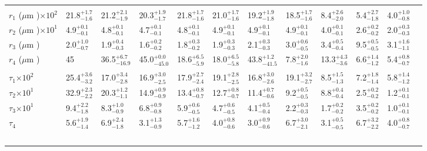 \documentclass[article,11pt]{emulateapj}
\def\mum{$\mu$m }
\begin{document}
\begin{table*}[!htb]
\begin{scriptsize}
\begin{tabular}{l l l l l l l l l l l l}
\hline\\[-0.1in]
$r_1$ (\mum)$\times 10^2$ &  21.8$^{+  1.7}_{-  1.6}$ &  21.2$^{+  2.1}_{-  1.9}$ &  20.3$^{+  1.9}_{-  1.7}$ &  21.8$^{+  1.7}_{-  1.6}$ &  21.0$^{+  1.7}_{-  1.6}$ &  19.2$^{+  1.9}_{-  1.8}$ &  18.5$^{+  1.7}_{-  1.6}$ &   8.4$^{+  2.6}_{-  2.0}$ &   5.4$^{+  2.7}_{-  1.8}$ &   4.0$^{+  1.0}_{-  0.8}$\\[0.05in]
$r_2$ (\mum)$\times 10^1$ &   4.9$^{+  0.1}_{-  0.1}$ &   4.8$^{+  0.1}_{-  0.1}$ &   4.7$^{+  0.1}_{-  0.1}$ &   4.8$^{+  0.1}_{-  0.1}$ &   4.9$^{+  0.1}_{-  0.1}$ &   4.9$^{+  0.1}_{-  0.1}$ &   4.9$^{+  0.1}_{-  0.1}$ &   4.0$^{+  0.1}_{-  0.1}$ &   2.6$^{+  0.2}_{-  0.2}$ &   2.0$^{+  0.3}_{-  0.3}$\\[0.05in]
             $r_3$ (\mum) &   2.0$^{+  1.0}_{-  0.7}$ &   1.9$^{+  0.4}_{-  0.3}$ &   1.6$^{+  0.2}_{-  0.2}$ &   1.8$^{+  0.3}_{-  0.2}$ &   1.9$^{+  0.3}_{-  0.3}$ &   2.1$^{+  0.3}_{-  0.3}$ &   3.0$^{+  0.6}_{-  0.5}$ &   3.4$^{+  0.5}_{-  0.4}$ &   9.5$^{+  0.5}_{-  0.5}$ &   3.1$^{+  1.6}_{-  1.1}$\\[0.05in]
             $r_4$ (\mum) &  45 &  36.5$^{+  6.7}_{- 16.9}$ &  45.0$^{+  0.0}_{- 45.0}$ &  18.6$^{+  6.5}_{-  5.9}$ &  18.0$^{+  6.5}_{-  5.8}$ &  43.8$^{+  1.2}_{- 41.5}$ &   7.8$^{+  2.0}_{-  1.6}$ &  13.3$^{+  4.3}_{-  3.6}$ &   6.6$^{+  1.4}_{-  1.2}$ &   5.4$^{+  0.8}_{-  0.7}$\\[0.05in]
\hline\\[-0.1in]
    $\tau_1$$\times 10^2$ &  25.4$^{+  3.6}_{-  3.2}$ &  17.0$^{+  3.4}_{-  2.8}$ &  16.9$^{+  3.0}_{-  2.5}$ &  17.9$^{+  2.7}_{-  2.4}$ &  19.1$^{+  2.8}_{-  2.5}$ &  16.8$^{+  3.0}_{-  2.6}$ &  19.1$^{+  3.2}_{-  2.7}$ &   8.5$^{+  1.5}_{-  1.3}$ &   7.2$^{+  1.8}_{-  1.4}$ &   5.8$^{+  1.4}_{-  1.2}$\\[0.05in]
    $\tau_2$$\times 10^1$ &  32.9$^{+  2.3}_{-  2.2}$ &  20.3$^{+  1.2}_{-  1.1}$ &  14.9$^{+  0.9}_{-  0.9}$ &  13.4$^{+  0.8}_{-  0.7}$ &  12.7$^{+  0.8}_{-  0.7}$ &  11.4$^{+  0.7}_{-  0.6}$ &   9.2$^{+  0.5}_{-  0.5}$ &   8.8$^{+  0.4}_{-  0.4}$ &   2.5$^{+  0.2}_{-  0.2}$ &   1.2$^{+  0.1}_{-  0.1}$\\[0.05in]
    $\tau_3$$\times 10^1$ &   9.4$^{+  2.2}_{-  1.8}$ &   8.3$^{+  1.0}_{-  0.9}$ &   6.8$^{+  0.9}_{-  0.8}$ &   5.9$^{+  0.6}_{-  0.5}$ &   4.7$^{+  0.6}_{-  0.5}$ &   4.1$^{+  0.5}_{-  0.4}$ &   2.2$^{+  0.3}_{-  0.3}$ &   1.7$^{+  0.2}_{-  0.2}$ &   3.5$^{+  0.2}_{-  0.2}$ &   1.0$^{+  0.1}_{-  0.1}$\\[0.05in]
                 $\tau_4$ &   5.6$^{+  1.9}_{-  1.4}$ &   6.9$^{+  2.4}_{-  1.8}$ &   3.1$^{+  1.3}_{-  0.9}$ &   5.7$^{+  1.6}_{-  1.2}$ &   4.0$^{+  0.8}_{-  0.6}$ &   3.0$^{+  0.9}_{-  0.6}$ &   6.7$^{+  3.0}_{-  2.1}$ &   3.1$^{+  0.5}_{-  0.5}$ &   6.7$^{+  3.2}_{-  2.2}$ &   4.0$^{+  0.8}_{-  0.7}$\\[0.05in]
$$
\end{tabular}
\end{scriptsize}
\end{table*}
\end{document}
